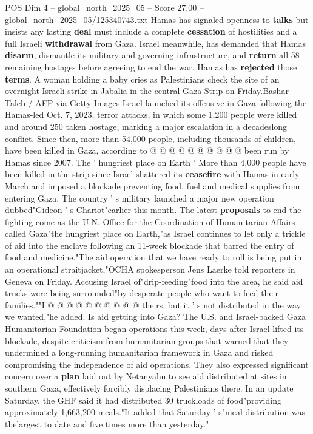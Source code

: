 \begin{textsample}{POS Dim 4 – global\_north\_2025\_05 – Score 27.00 – global\_north\_2025\_05/125340743.txt}
Hamas has signaled openness to \textbf{talks} but insists any lasting \textbf{deal} must include a complete \textbf{cessation} of hostilities and a full Israeli \textbf{withdrawal} from Gaza.
Israel meanwhile, has demanded that Hamas \textbf{disarm}, dismantle its military and governing infrastructure, and \textbf{return} all 58 remaining hostages before agreeing to end the war.
Hamas has \textbf{rejected} those \textbf{terms}.
A woman holding a baby cries as Palestinians check the site of an overnight Israeli strike in Jabalia in the central Gaza Strip on Friday.Bashar Taleb / AFP via Getty Images Israel launched its offensive in Gaza following the Hamas-led Oct. 7, 2023, terror attacks, in which some 1,200 people were killed and around 250 taken hostage, marking a major escalation in a decadeslong conflict.
Since then, more than 54,000 people, including thousands of children, have been killed in Gaza, according to @ @ @ @ @ @ @ @ @ @ been run by Hamas since 2007.
The ' hungriest place on Earth ' More than 4,000 people have been killed in the strip since Israel shattered its \textbf{ceasefire} with Hamas in early March and imposed a blockade preventing food, fuel and medical supplies from entering Gaza.
The country ' s military launched a major new operation dubbed"Gideon ' s Chariot"earlier this month.
The latest \textbf{proposals} to end the fighting come as the U.N.
Office for the Coordination of Humanitarian Affairs called Gaza"the hungriest place on Earth,"as Israel continues to let only a trickle of aid into the enclave following an 11-week blockade that barred the entry of food and medicine."The aid operation that we have ready to roll is being put in an operational straitjacket,"OCHA spokesperson Jens Laerke told reporters in Geneva on Friday.
Accusing Israel of"drip-feeding"food into the area, he said aid trucks were being surrounded"by desperate people who want to feed their families.""I @ @ @ @ @ @ @ @ @ @ theirs, but it ' s not distributed in the way we wanted,"he added.
Is aid getting into Gaza?
The U.S. and Israel-backed Gaza Humanitarian Foundation began operations this week, days after Israel lifted its blockade, despite criticism from humanitarian groups that warned that they undermined a long-running humanitarian framework in Gaza and risked compromising the independence of aid operations.
They also expressed significant concern over a \textbf{plan} laid out by Netanyahu to see aid distributed at sites in southern Gaza, effectively forcibly displacing Palestinians there.
In an update Saturday, the GHF said it had distributed 30 truckloads of food"providing approximately 1,663,200 meals."It added that Saturday ' s"meal distribution was thelargest to date and five times more than yesterday."

\end{textsample}
